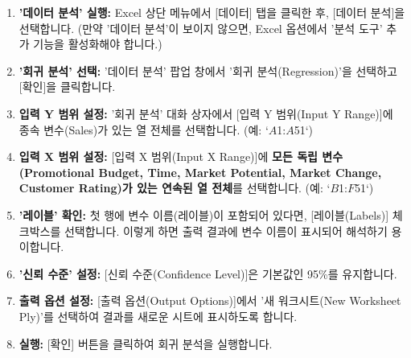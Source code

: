 \documentclass[11pt,a4paper]{article}
\begin{document}
\begin{tcolorbox}[title=\textbf{Excel 데이터 분석 도구 사용하기}]
\begin{enumerate}
    \item \textbf{'데이터 분석' 실행:} Excel 상단 메뉴에서 [데이터] 탭을 클릭한 후, [데이터 분석]을 선택합니다. (만약 '데이터 분석'이 보이지 않으면, Excel 옵션에서 '분석 도구' 추가 기능을 활성화해야 합니다.)
    \item \textbf{'회귀 분석' 선택:} '데이터 분석' 팝업 창에서 '회귀 분석(Regression)'을 선택하고 [확인]을 클릭합니다.
    \item \textbf{입력 Y 범위 설정:} '회귀 분석' 대화 상자에서 [입력 Y 범위(Input Y Range)]에 종속 변수(Sales)가 있는 열 전체를 선택합니다. (예: `$A$1:$A$51`)
    \item \textbf{입력 X 범위 설정:} [입력 X 범위(Input X Range)]에 \textbf{모든 독립 변수(Promotional Budget, Time, Market Potential, Market Change, Customer Rating)가 있는 연속된 열 전체}를 선택합니다. (예: `$B$1:$F$51`)
    \item \textbf{'레이블' 확인:} 첫 행에 변수 이름(레이블)이 포함되어 있다면, [레이블(Labels)] 체크박스를 선택합니다. 이렇게 하면 출력 결과에 변수 이름이 표시되어 해석하기 용이합니다.
    \item \textbf{'신뢰 수준' 설정:} [신뢰 수준(Confidence Level)]은 기본값인 95\%를 유지합니다.
    \item \textbf{출력 옵션 설정:} [출력 옵션(Output Options)]에서 '새 워크시트(New Worksheet Ply)'를 선택하여 결과를 새로운 시트에 표시하도록 합니다.
    \item \textbf{실행:} [확인] 버튼을 클릭하여 회귀 분석을 실행합니다.
\end{enumerate}
\end{tcolorbox}
\end{document}
